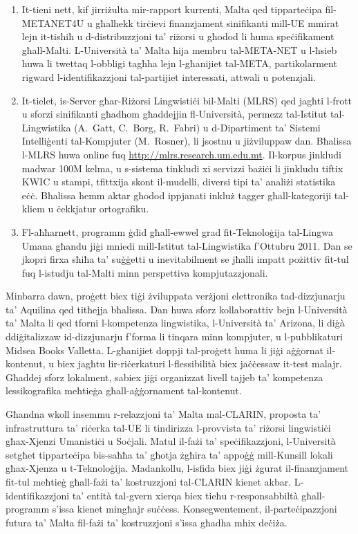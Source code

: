 \begin{multicols}{2}
\begin{enumerate}
\item It-tieni nett, kif jirriżulta mir-rapport kurrenti, Malta qed tipparteċipa fil-METANET4U u għalhekk tirċievi finanzjament sinifikanti mill-UE mmirat lejn it-tisħiħ u d-distribuzzjoni ta’ riżorsi u għodod li huma speċifikament għall-Malti. L-Università ta’ Malta hija membru tal-META-NET u l-ħsieb huwa li twettaq l-obbligi tagħha lejn l-għanijiet tal-META, partikolarment rigward l-identifikazzjoni tal-partijiet interessati, attwali u potenzjali. 

\item It-tielet, is-Server għar-Riżorsi Lingwistiċi bil-Malti (MLRS) qed jagħti l-frott u sforzi sinifikanti għadhom għaddejjin fl-Università, permezz tal-Istitut tal-Lingwistika (A.~Gatt, C.~Borg, R.~Fabri) u d-Dipartiment ta’ Sistemi Intelliġenti tal-Kompjuter (M.~Rosner), li jsostnu u jiżviluppaw dan. Bħalissa l-MLRS huwa online fuq \url{http://mlrs.research.um.edu.mt}. Il-korpus jinkludi madwar 100M kelma, u s-sistema tinkludi xi servizzi bażiċi li jinkludu tiftix KWIC u stampi, tfittxija skont il-mudelli, diversi tipi ta’ analiżi statistika eċċ. Bħalissa hemm aktar għodod ippjanati inkluż tagger għall-kategoriji tal-kliem u ċekkjatur ortografiku.

\item Fl-aħħarnett, programm ġdid għall-ewwel grad fit-Teknoloġija tal-Lingwa Umana għandu jiġi mniedi mill-Istitut tal-Lingwistika f’Ottubru 2011. Dan se jkopri firxa sħiħa ta’ suġġetti u inevitabilment se jħalli impatt pożittiv fit-tul fuq l-istudju tal-Malti minn perspettiva kompjutazzjonali.
\end{enumerate}

Minbarra dawn, proġett biex tiġi żviluppata verżjoni elettronika tad-dizzjunarju ta’ Aquilina \cite{Aquilina:1987,Aquilina:1990} qed titħejja bħalissa. Dan huwa sforz kollaborattiv bejn l-Università ta’ Malta li qed tforni l-kompetenza lingwistika, l-Università ta’ Arizona, li diġà ddiġitalizzaw id-dizzjunarju f’forma li tinqara minn kompjuter, u l-pubblikaturi Midsea Books Valletta. L-għanijiet doppji tal-proġett huma li jiġi aġġornat il-kontenut, u biex jagħtu lir-riċerkaturi l-flessibilità biex jaċċessaw it-test malajr. Għaddej sforz lokalment, sabiex jiġi organizzat livell tajjeb ta’ kompetenza lessikografika meħtieġa għall-aġġornament tal-kontenut.

Għandna wkoll insemmu r-relazzjoni ta’ Malta mal-CLARIN,  proposta ta’ infrastruttura ta’ riċerka tal-UE li tindirizza l-provvista ta’ riżorsi lingwistiċi għax-Xjenzi Umanistiċi u Soċjali. Matul il-fażi ta’ speċifikazzjoni, l-Università setgħet tipparteċipa bis-saħħa ta’ għotja żgħira ta’ appoġġ mill-Kunsill lokali għax-Xjenza u t-Teknoloġija. Madankollu, l-isfida biex jiġi żgurat il-finanzjament fit-tul meħtieġ għall-fażi ta’ kostruzzjoni tal-CLARIN kienet akbar. L-identifikazzjoni ta’ entità tal-gvern xierqa biex tieħu r-responsabbiltà għall-programm s’issa kienet mingħajr suċċess. Konsegwentement, il-parteċipazzjoni futura ta’ Malta fil-fażi ta’ kostruzzjoni s’issa għadha mhix deċiża.


\end{multicols}
